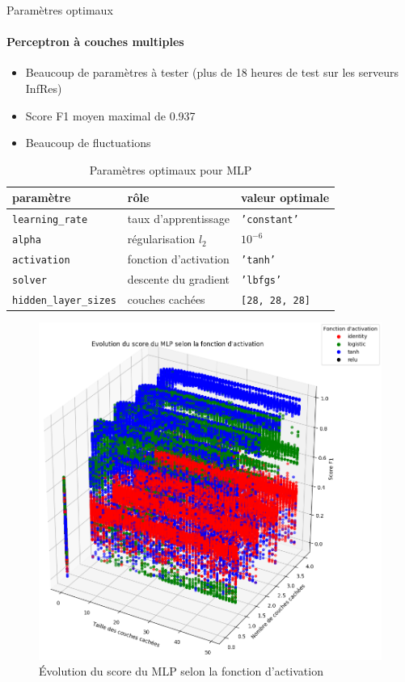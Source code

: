 \documentclass[usenames,dvipsnames]{beamer}
\begin{document}
\begin{frame}{Paramètres optimaux}
\framesubtitle{Perceptron à couches multiples}

\begin{itemize}
\item Beaucoup de paramètres à tester (plus de 18 heures de test sur les serveurs InfRes)
\item Score F1 moyen maximal de 0.937
\item Beaucoup de fluctuations
\end{itemize}

\begin{table}
\centering
\begin{tabular}{l l l}
paramètre & rôle & valeur optimale \\
\hline
\texttt{learning\_rate} & taux d'apprentissage & \texttt{'constant'}\\
\texttt{alpha} & régularisation $l_2$ & $10^{-6}$ \\
\texttt{activation} & fonction d'activation & \texttt{'tanh'}\\
\texttt{solver} & descente du gradient & \texttt{'lbfgs'}\\
\texttt{hidden\_layer\_sizes} & couches cachées & \texttt{[28, 28, 28]}\\
\end{tabular}
\caption{Paramètres optimaux pour MLP}
\end{table}

\end{frame}

\begin{frame}
\begin{figure}
\centering
\includegraphics[width=.56\textwidth]{img/mlp_activation_crop.png}
\caption{Évolution du score du MLP selon la fonction d'activation}
\end{figure}
\end{frame}
\end{document}
